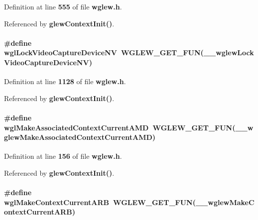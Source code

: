 Definition at line {\bf 555} of file {\bf wglew.\+h}.



Referenced by {\bf glew\+Context\+Init()}.

\paragraph[{wgl\+Lock\+Video\+Capture\+Device\+NV}]{\setlength{\rightskip}{0pt plus 5cm}\#define wgl\+Lock\+Video\+Capture\+Device\+NV~{\bf W\+G\+L\+E\+W\+\_\+\+G\+E\+T\+\_\+\+F\+UN}({\bf \+\_\+\+\_\+wglew\+Lock\+Video\+Capture\+Device\+NV})}\label{wglew_8h_aecdc47508c36697dfd8fae73bb2f2080}


Definition at line {\bf 1128} of file {\bf wglew.\+h}.



Referenced by {\bf glew\+Context\+Init()}.

\paragraph[{wgl\+Make\+Associated\+Context\+Current\+A\+MD}]{\setlength{\rightskip}{0pt plus 5cm}\#define wgl\+Make\+Associated\+Context\+Current\+A\+MD~{\bf W\+G\+L\+E\+W\+\_\+\+G\+E\+T\+\_\+\+F\+UN}({\bf \+\_\+\+\_\+wglew\+Make\+Associated\+Context\+Current\+A\+MD})}\label{wglew_8h_a8c2a6222f9c448c5288e0f10421f8f84}


Definition at line {\bf 156} of file {\bf wglew.\+h}.



Referenced by {\bf glew\+Context\+Init()}.

\paragraph[{wgl\+Make\+Context\+Current\+A\+RB}]{\setlength{\rightskip}{0pt plus 5cm}\#define wgl\+Make\+Context\+Current\+A\+RB~{\bf W\+G\+L\+E\+W\+\_\+\+G\+E\+T\+\_\+\+F\+UN}({\bf \+\_\+\+\_\+wglew\+Make\+Context\+Current\+A\+RB})}\label{wglew_8h_af431472ec18b1a7245544e64078752fd}


